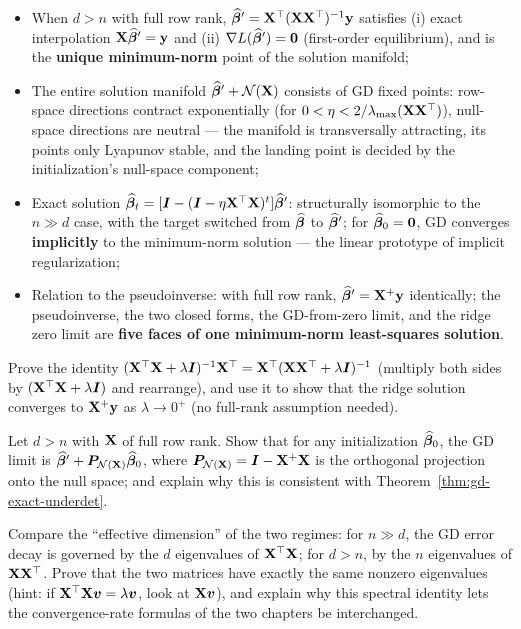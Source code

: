 \begin{keybox}
\begin{itemize}
  \item When $d > n$ with full row rank, $\widehat{\bm{\beta}}' = \mathbf{X}^\top(\mathbf{X}\mathbf{X}^\top)^{-1}\mathbf{y}$ satisfies (i) exact interpolation $\mathbf{X}\widehat{\bm{\beta}}' = \mathbf{y}$ and (ii) $\nabla L(\widehat{\bm{\beta}}') = \mathbf{0}$ (first-order equilibrium), and is the \textbf{unique minimum-norm} point of the solution manifold;
  \item The entire solution manifold $\widehat{\bm{\beta}}' + \mathcal{N}(\mathbf{X})$ consists of GD fixed points: row-space directions contract exponentially (for $0 < \eta < 2/\lambda_{\max}(\mathbf{X}\mathbf{X}^\top)$), null-space directions are neutral — the manifold is transversally attracting, its points only Lyapunov stable, and the landing point is decided by the initialization's null-space component;
  \item Exact solution $\widehat{\bm{\beta}}_t = [\bm{I} - (\bm{I} - \eta\mathbf{X}^\top\mathbf{X})^t]\widehat{\bm{\beta}}'$: structurally isomorphic to the $n \gg d$ case, with the target switched from $\widehat{\bm{\beta}}$ to $\widehat{\bm{\beta}}'$; for $\widehat{\bm{\beta}}_0 = \mathbf{0}$, GD converges \textbf{implicitly} to the minimum-norm solution — the linear prototype of implicit regularization;
  \item Relation to the pseudoinverse: with full row rank, $\widehat{\bm{\beta}}' = \mathbf{X}^+\mathbf{y}$ identically; the pseudoinverse, the two closed forms, the GD-from-zero limit, and the ridge zero limit are \textbf{five faces of one minimum-norm least-squares solution}.
\end{itemize}
\end{keybox}

\begin{exercise}\label{ex:ridge-dual}
Prove the identity $(\mathbf{X}^\top\mathbf{X} + \lambda\bm{I})^{-1}\mathbf{X}^\top = \mathbf{X}^\top(\mathbf{X}\mathbf{X}^\top + \lambda\bm{I})^{-1}$ (multiply both sides by $(\mathbf{X}^\top\mathbf{X} + \lambda\bm{I})$ and rearrange), and use it to show that the ridge solution converges to $\mathbf{X}^+\mathbf{y}$ as $\lambda \to 0^+$ (no full-rank assumption needed).
\end{exercise}

\begin{exercise}\label{ex:gd-limit-anyinit}
Let $d > n$ with $\mathbf{X}$ of full row rank. Show that for any initialization $\widehat{\bm{\beta}}_0$, the GD limit is $\widehat{\bm{\beta}}' + \bm{P}_{\mathcal{N}(\mathbf{X})} \widehat{\bm{\beta}}_0$, where $\bm{P}_{\mathcal{N}(\mathbf{X})} = \bm{I} - \mathbf{X}^+\mathbf{X}$ is the orthogonal projection onto the null space; and explain why this is consistent with Theorem~\ref{thm:gd-exact-underdet}.
\end{exercise}

\begin{exercise}\label{ex:spectrum}
Compare the ``effective dimension'' of the two regimes: for $n \gg d$, the GD error decay is governed by the $d$ eigenvalues of $\mathbf{X}^\top\mathbf{X}$; for $d > n$, by the $n$ eigenvalues of $\mathbf{X}\mathbf{X}^\top$. Prove that the two matrices have exactly the same nonzero eigenvalues (hint: if $\mathbf{X}^\top\mathbf{X} \bm{v} = \lambda \bm{v}$, look at $\mathbf{X} \bm{v}$), and explain why this spectral identity lets the convergence-rate formulas of the two chapters be interchanged.
\end{exercise}
